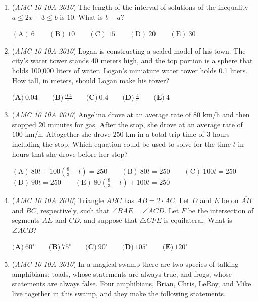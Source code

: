 \begin{enumerate}
 $\mathrm{(A)}\ 2011 \qquad \mathrm{(B)}\ 2012 \qquad \mathrm{(C)}\ 2013 \qquad \mathrm{(D)}\ 2015 \qquad \mathrm{(E)}\ 2017$


	\item (\textit{AMC 10 10A 2010}) The length of the interval of solutions of the inequality $a \le 2x + 3 \le b$ is $10$. What is $b - a$?


 $\mathrm{(A)}\ 6 \qquad \mathrm{(B)}\ 10 \qquad \mathrm{(C)}\ 15 \qquad \mathrm{(D)}\ 20 \qquad \mathrm{(E)}\ 30$


	\item (\textit{AMC 10 10A 2010}) Logan is constructing a scaled model of his town. The city's water tower stands 40 meters high, and the top portion is a sphere that holds 100,000 liters of water. Logan's miniature water tower holds 0.1 liters. How tall, in meters, should Logan make his tower?


 $\textbf{(A)}\ 0.04 \qquad \textbf{(B)}\ \frac{0.4}{\pi} \qquad \textbf{(C)}\ 0.4 \qquad \textbf{(D)}\ \frac{4}{\pi} \qquad \textbf{(E)}\ 4$


	\item (\textit{AMC 10 10A 2010}) Angelina drove at an average rate of $80$ km/h and then stopped $20$ minutes for gas. After the stop, she drove at an average rate of $100$ km/h. Altogether she drove $250$ km in a total trip time of $3$ hours including the stop. Which equation could be used to solve for the time $t$ in hours that she drove before her stop?


 

$\mathrm{(A)}\ 80t + 100\left(\frac{8}{3} -t\right) = 250 \qquad \mathrm{(B)}\ 80t = 250  \qquad \mathrm{(C)}\ 100t = 250$
$\mathrm{(D)}\ 90t = 250 \qquad \mathrm{(E)}\ 80\left(\frac{8}{3} -t\right) + 100t = 250$


	\item (\textit{AMC 10 10A 2010}) Triangle $ABC$ has $AB=2 \cdot AC$. Let $D$ and $E$ be on $\overline{AB}$ and $\overline{BC}$, respectively, such that $\angle BAE = \angle ACD$. Let $F$ be the intersection of segments $AE$ and $CD$, and suppose that $\triangle CFE$ is equilateral. What is $\angle ACB$?


 $\textbf{(A)}\ 60^\circ \qquad \textbf{(B)}\ 75^\circ \qquad \textbf{(C)}\ 90^\circ \qquad \textbf{(D)}\ 105^\circ \qquad \textbf{(E)}\ 120^\circ$


	\item (\textit{AMC 10 10A 2010}) In a magical swamp there are two species of talking amphibians: toads, whose statements are always true, and frogs, whose statements are always false. Four amphibians, Brian, Chris, LeRoy, and Mike live together in this swamp, and they make the following statements.



\end{enumerate}
